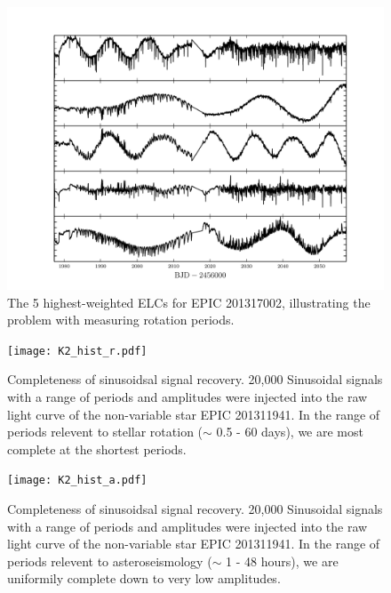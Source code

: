 \documentclass[useAMS, usenatbib]{aastex}
\begin{document}
\begin{figure}
\begin{center}
\includegraphics[width=6in, clip=true]{201317002_top5.pdf}
\caption{The 5 highest-weighted ELCs for EPIC 201317002,
illustrating the problem with measuring rotation periods.}
\label{fig:top5}
\end{center}
\end{figure}

\begin{figure}
\begin{center}
\texttt{[image: K2\_hist\_r.pdf]}
\caption{Completeness of sinusoidsal signal recovery. 20,000 Sinusoidal signals
with a range of periods and amplitudes were injected into the raw light curve
of the non-variable star EPIC 201311941. In the range of periods relevent to
stellar rotation ($\sim$ 0.5 - 60 days), we are most complete at the shortest
periods.}
\label{fig:K2_hist_r}
\end{center}
\end{figure}

\begin{figure}
\begin{center}
\texttt{[image: K2\_hist\_a.pdf]}
\caption{Completeness of sinusoidsal signal recovery. 20,000 Sinusoidal signals
with a range of periods and amplitudes were injected into the raw light curve
of the non-variable star EPIC 201311941. In the range of periods relevent to
asteroseismology ($\sim$ 1 - 48 hours), we are uniformily complete down to
very low amplitudes.}
\label{fig:K2_hist_a}
\end{center}
\end{figure}
\end{document}
